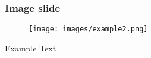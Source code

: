 \begin{frame}
\frametitle{Image slide}

\begin{figure}[htbp]
\begin{center}
\texttt{[image: images/example2.png]}
\end{center}
\end{figure}

\small{Example Text}

\end{frame}


